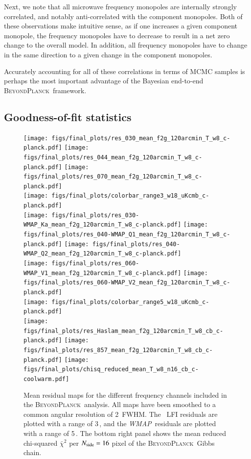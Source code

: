 \documentclass[twocolumn]{aa}
\def\WMAP{\emph{WMAP}}
\newcommand{\BP}{\textsc{BeyondPlanck}}
\begin{document}
Next, we note that all microwave frequency monopoles are internally
strongly correlated, and notably anti-correlated with the component
monopoles. Both of these observations make intuitive sense, as if
one increases a given component monopole, the frequency monopoles have
to decrease to result in a net zero change to the overall model. In
addition, all frequency monopoles have to change in the same
direction to a given change in the component monopoles.

Accurately accounting for all of these correlations in terms of MCMC
samples is perhaps the most important advantage of the Bayesian
end-to-end \BP\ framework.

\subsection{Goodness-of-fit statistics}
\label{sec:gof}

\begin{figure}
  \center	
  \texttt{[image: figs/final\_plots/res\_030\_mean\_f2g\_120arcmin\_T\_w8\_c-planck.pdf]}
  \texttt{[image: figs/final\_plots/res\_044\_mean\_f2g\_120arcmin\_T\_w8\_c-planck.pdf]}
  \texttt{[image: figs/final\_plots/res\_070\_mean\_f2g\_120arcmin\_T\_w8\_c-planck.pdf]}\\
  \texttt{[image: figs/final\_plots/colorbar\_range3\_w18\_uKcmb\_c-planck.pdf]}\vspace{0.3cm}\\
  \texttt{[image: figs/final\_plots/res\_030-WMAP\_Ka\_mean\_f2g\_120arcmin\_T\_w8\_c-planck.pdf]}
  \texttt{[image: figs/final\_plots/res\_040-WMAP\_Q1\_mean\_f2g\_120arcmin\_T\_w8\_c-planck.pdf]}
  \texttt{[image: figs/final\_plots/res\_040-WMAP\_Q2\_mean\_f2g\_120arcmin\_T\_w8\_c-planck.pdf]}\\
  \texttt{[image: figs/final\_plots/res\_060-WMAP\_V1\_mean\_f2g\_120arcmin\_T\_w8\_c-planck.pdf]}
  \texttt{[image: figs/final\_plots/res\_060-WMAP\_V2\_mean\_f2g\_120arcmin\_T\_w8\_c-planck.pdf]}\\
  \texttt{[image: figs/final\_plots/colorbar\_range5\_w18\_uKcmb\_c-planck.pdf]}\vspace{0.3cm}\\
  \texttt{[image: figs/final\_plots/res\_Haslam\_mean\_f2g\_120arcmin\_T\_w8\_cb\_c-planck.pdf]}
  \texttt{[image: figs/final\_plots/res\_857\_mean\_f2g\_120arcmin\_T\_w8\_cb\_c-planck.pdf]}
  \texttt{[image: figs/final\_plots/chisq\_reduced\_mean\_T\_w8\_n16\_cb\_c-coolwarm.pdf]}  
  \caption{Mean residual maps for the different frequency channels
    included in the \BP\ analysis. All maps have been smoothed to a
    common angular resolution of 2\deg\ FWHM. The \Planck\ LFI
    residuals are plotted with a range of 3\,\muKCMB, and the
    \WMAP\ residuals are plotted with a range of 5\,\muKCMB. The
    bottom right panel shows the mean reduced chi-squared
    $\bar{\chi}^2$ per $\nside = 16$ pixel of the \BP\ Gibbs chain.}
  \label{fig:BP_residuals_mean}
\end{figure}
\end{document}
